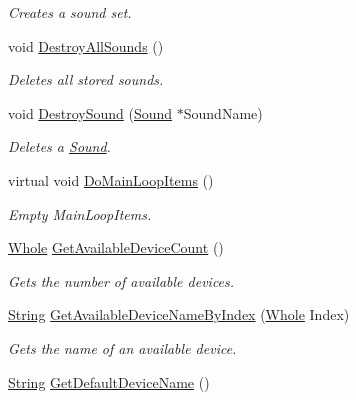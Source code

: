 \begin{DoxyCompactItemize}
\begin{DoxyCompactList}\small\item\em Creates a sound set. \item\end{DoxyCompactList}\item 
void \hyperlink{classphys_1_1SoundManager_a0f523240530abd5ab437c9eace78056a}{DestroyAllSounds} ()
\begin{DoxyCompactList}\small\item\em Deletes all stored sounds. \item\end{DoxyCompactList}\item 
void \hyperlink{classphys_1_1SoundManager_a6a996829cab647ccf1ca401361af7167}{DestroySound} (\hyperlink{classphys_1_1Sound}{Sound} $\ast$SoundName)
\begin{DoxyCompactList}\small\item\em Deletes a \hyperlink{classphys_1_1Sound}{Sound}. \item\end{DoxyCompactList}\item 
virtual void \hyperlink{classphys_1_1SoundManager_a577b228753ea19856b8476ab831e547e}{DoMainLoopItems} ()
\begin{DoxyCompactList}\small\item\em Empty MainLoopItems. \item\end{DoxyCompactList}\item 
\hyperlink{namespacephys_a460f6bc24c8dd347b05e0366ae34f34a}{Whole} \hyperlink{classphys_1_1SoundManager_adb5717af71da8829600fd613a2ce615b}{GetAvailableDeviceCount} ()
\begin{DoxyCompactList}\small\item\em Gets the number of available devices. \item\end{DoxyCompactList}\item 
\hyperlink{namespacephys_aa03900411993de7fbfec4789bc1d392e}{String} \hyperlink{classphys_1_1SoundManager_a842f7cba6b12585bca77f642ecb8be79}{GetAvailableDeviceNameByIndex} (\hyperlink{namespacephys_a460f6bc24c8dd347b05e0366ae34f34a}{Whole} Index)
\begin{DoxyCompactList}\small\item\em Gets the name of an available device. \item\end{DoxyCompactList}\item 
\hyperlink{namespacephys_aa03900411993de7fbfec4789bc1d392e}{String} \hyperlink{classphys_1_1SoundManager_ac4814331683597034b26fac5c1c69bfa}{GetDefaultDeviceName} ()

\end{DoxyCompactItemize}
